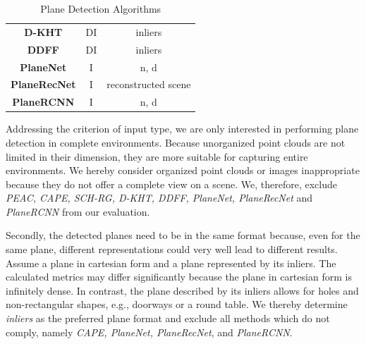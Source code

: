 \documentclass[main.tex]{subfiles}
\begin{document}
\begin{table}[H]
\begin{tabular}{c|c|c}
        \textbf{D-KHT}  \cite{Vera_Lucio_Fernandes_Velho_2018}           & DI                  & inliers              \\  %
        \textbf{DDFF} \cite{Roychoudhury_Missura_Bennewitz_2021}         & DI                  & inliers              \\  %
        \textbf{PlaneNet} \cite{Liu_Yang_Ceylan_Yumer_Furukawa_2018}     & I                   & n, d            \\  %
        \textbf{PlaneRecNet} \cite{Xie_Shu_Rambach_Pagani_Stricker_2022} & I                   & reconstructed scene  \\  %
        \textbf{PlaneRCNN} \cite{Liu_Kim_Gu_Furukawa_Kautz_2019}         & I                   & n, d            \\  %
    \end{tabular}
    \caption{Plane Detection Algorithms}
    \label{tab:algos}
\end{table}

Addressing the criterion of input type, we are only interested in performing plane detection in complete environments.
Because unorganized point clouds are not limited in their dimension, they are more suitable for capturing entire environments.
We hereby consider organized point clouds or images inappropriate because they do not offer a complete view
on a scene.
We, therefore, exclude  \textit{PEAC, CAPE, SCH-RG, D-KHT, DDFF, PlaneNet, PlaneRecNet} and \textit{PlaneRCNN} from our evaluation.

Secondly, the detected planes need to be in the same format because, even for the same plane, different representations could very well lead to different results.
Assume a plane in cartesian form and a plane represented by its inliers. The calculated metrics may differ significantly because the plane in cartesian form is infinitely dense.
In contrast, the plane described by its inliers allows for holes and non-rectangular shapes, e.g., doorways or a round table.
We thereby determine \textit{inliers} as the preferred plane format and exclude all methods which do not comply, namely \textit{CAPE, PlaneNet, PlaneRecNet}, and \textit{PlaneRCNN}.
\end{document}
